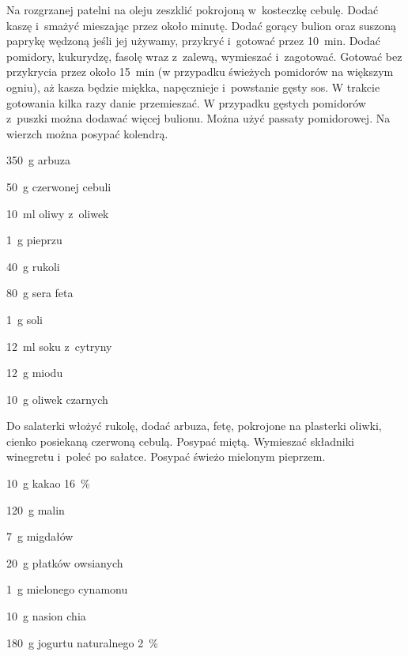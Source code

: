 \documentclass[../kucharek.tex]{subfiles}
\begin{document}
Na rozgrzanej patelni na oleju zeszklić pokrojoną w~kosteczkę cebulę. Dodać
kaszę i~smażyć mieszając przez około minutę. Dodać gorący bulion oraz suszoną
paprykę wędzoną jeśli jej używamy, przykryć i~gotować przez \qty{10}{\minute}.
Dodać pomidory, kukurydzę, fasolę wraz z~zalewą, wymieszać i~zagotować. Gotować
bez przykrycia przez około \qty{15}{\minute} (w przypadku świeżych pomidorów na
większym ogniu), aż kasza będzie miękka, napęcznieje i~powstanie gęsty sos. W
trakcie gotowania kilka razy danie przemieszać. W przypadku gęstych pomidorów
z~puszki można dodawać więcej bulionu. Można użyć passaty pomidorowej. Na
wierzch można posypać kolendrą.


\begin{Ingred}
    \item \qty{350}{\gram} arbuza
    \item \qty{50}{\gram} czerwonej cebuli
    \item \qty{10}{\milli\litre} oliwy z~oliwek
    \item \qty{1}{\gram} pieprzu
    \item \qty{40}{\gram} rukoli
    \item \qty{80}{\gram} sera feta
    \item \qty{1}{\gram} soli
    \item \qty{12}{\milli\litre} soku z~cytryny
    \item \qty{12}{\gram} miodu
    \item \qty{10}{\gram} oliwek czarnych
\end{Ingred}

Do salaterki włożyć rukolę, dodać arbuza, fetę, pokrojone na plasterki oliwki,
cienko posiekaną czerwoną cebulą. Posypać miętą. Wymieszać składniki winegretu
i~poleć po sałatce. Posypać świeżo mielonym pieprzem.


\begin{Ingred}
    \item \qty{10}{\gram} kakao \qty{16}{\percent}
    \item \qty{120}{\gram} malin
    \item \qty{7}{\gram} migdałów
    \item \qty{20}{\gram} płatków owsianych
    \item \qty{1}{\gram} mielonego cynamonu
    \item \qty{10}{\gram} nasion chia
    \item \qty{180}{\gram} jogurtu naturalnego \qty{2}{\percent}
\end{Ingred}
\end{document}
